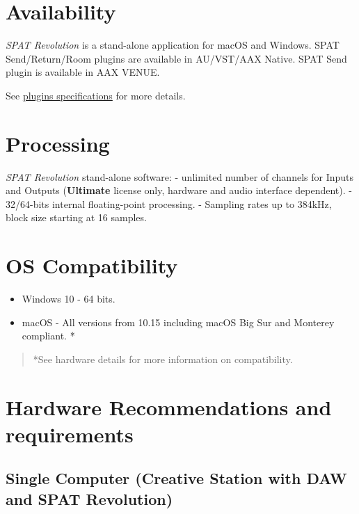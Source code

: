 \documentclass[
  letterpaper,
  DIV=11,
  numbers=noendperiod]{scrreport}
\begin{document}
\hypertarget{availability}{%
\section{Availability}\label{availability}}

\emph{SPAT Revolution} is a stand-alone application for macOS and
Windows. SPAT Send/Return/Room plugins are available in AU/VST/AAX
Native. SPAT Send plugin is available in AAX VENUE.

See \href{https://www.flux.audio/plugin-specifications/}{plugins
specifications} for more details.

\hypertarget{processing}{%
\section{Processing}\label{processing}}

\emph{SPAT Revolution} stand-alone software: - unlimited number of
channels for Inputs and Outputs (\textbf{Ultimate} license only,
hardware and audio interface dependent). - 32/64-bits internal
floating-point processing. - Sampling rates up to 384kHz, block size
starting at 16 samples.

\hypertarget{os-compatibility}{%
\section{OS Compatibility}\label{os-compatibility}}

\begin{itemize}
\item
  Windows 10 - 64 bits.
\item
  macOS - All versions from 10.15 including macOS Big Sur and Monterey
  compliant. *
\end{itemize}

\begin{quote}
*See hardware details for more information on compatibility.
\end{quote}

\hypertarget{hardware-recommendations-and-requirements}{%
\section{Hardware Recommendations and
requirements}\label{hardware-recommendations-and-requirements}}

\hypertarget{single-computer-creative-station-with-daw-and-spat-revolution}{%
\subsection{Single Computer (Creative Station with DAW and SPAT
Revolution)}\label{single-computer-creative-station-with-daw-and-spat-revolution}}
\end{document}
